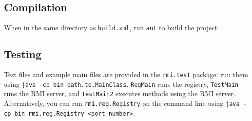 \documentclass{scrartcl}
\begin{document}
\subsection{Compilation}

When in the same directory as \verb$build.xml$, run \verb$ant$ to build the project.

\subsection{Testing}

Test files and example main files are provided in the \verb$rmi.test$ package: run them using \verb$java -cp bin path.to.MainClass$.  \verb$RegMain$ runs the registry, \verb$TestMain$ runs the RMI server, and \verb$TestMain2$ executes methods using the RMI server.. Alternatively, you can run \verb$rmi.reg.Registry$ on the command line using \verb$java -cp bin rmi.reg.Registry <port number>$.  
\end{document}
